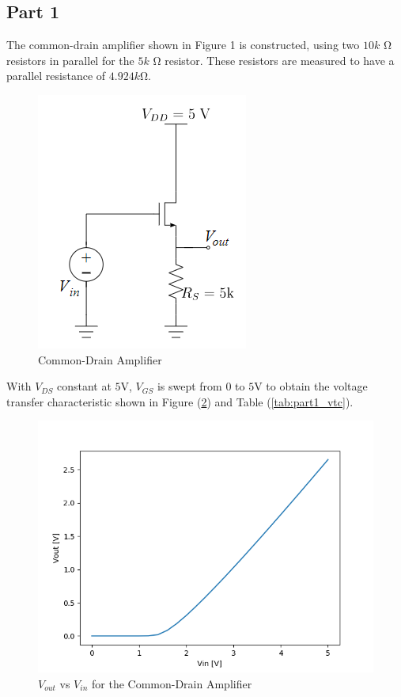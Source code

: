 \subsection{Part 1}
The common-drain amplifier shown in Figure 1 is constructed, using two $10k$ \si{\ohm} resistors in parallel for the $5k$ \si{\ohm} resistor.
These resistors are measured to have a parallel resistance of $4.924k$\si{\ohm}.

\FloatBarrier

\begin{figure}[h!]
	\centering
	\includegraphics[scale=0.45]{./images/circuit_1.PNG}
	\caption{Common-Drain Amplifier}
	\label{fig:circuit_1}
\end{figure}

\FloatBarrier

With $V_{DS}$ constant at $5$\si{\volt}, $V_{GS}$ is swept from 0 to $5$\si{\volt} to obtain the voltage transfer characteristic shown in Figure (\ref{fig:part1_vtc}) and Table (\ref{tab:part1_vtc}).

\FloatBarrier

\begin{figure}[h!]
	\centering
	\includegraphics[scale=0.45]{./images/part1_vtc.PNG}
	\caption{$V_{out}$ vs $V_{in}$ for the Common-Drain Amplifier}
	\label{fig:part1_vtc}
\end{figure}

